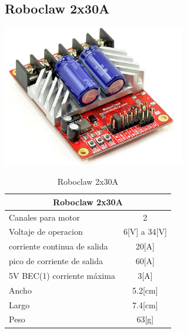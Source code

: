 \documentclass[a4paper]{book}
\begin{document}
\subsection{Roboclaw 2x30A}

\begin{center}
\includegraphics[width=0.6\textwidth]{Figures/Hardware/Partes/Roboclaw_2x30A.png}
\label{fig:Hardware:Partes:Roboclaw:2x30A}
\end{center}


\begin{table}[H]
\begin{center}
\begin{tabular}{|l|l|}%


\hline
\multicolumn{2}{|c|}{Roboclaw 2x30A} \\ \hline %
Canales para motor & \multicolumn{1}{|c|}{2}\\ \hline
Voltaje de operacion & \multicolumn{1}{|c|}{6[V] a 34[V]}\\ \hline
corriente continua de salida & \multicolumn{1}{|c|}{20[A]}\\ \hline
pico de corriente de salida & \multicolumn{1}{|c|}{60[A]}\\ \hline
5V BEC(1) corriente máxima & \multicolumn{1}{|c|}{3[A]}\\ \hline
Ancho & \multicolumn{1}{|c|}{5.2[cm]}\\ \hline
Largo & \multicolumn{1}{|c|}{7.4[cm]}\\ \hline
Peso & \multicolumn{1}{|c|}{63[g]}\\ \hline

\end{tabular}
\caption{Roboclaw 2x30A}
\label{Datos del Roboclaw}
\end{center}
\end{table}
\end{document}
